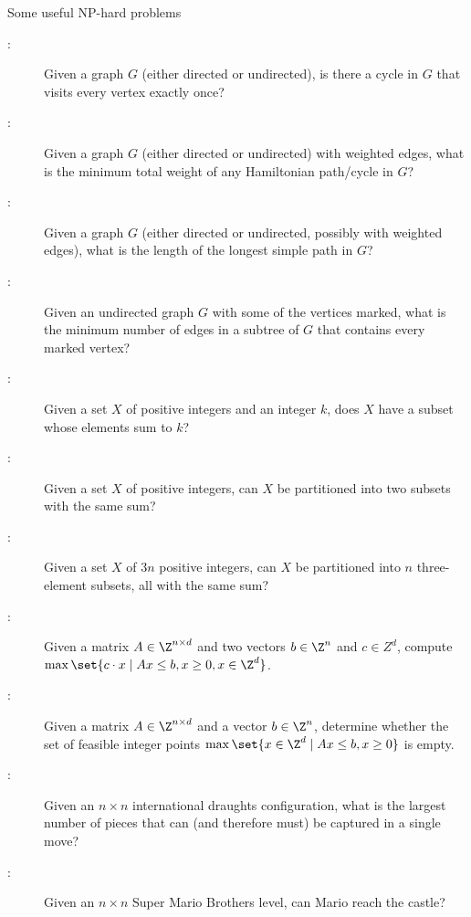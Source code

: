 \documentclass[11pt]{article}
\begin{document}
\begin{Rubric}{Some useful NP-hard problems}
\begin{description}
\item[:]
Given a graph $G$ (either directed or undirected), is there a cycle in $G$ that visits every vertex exactly once?

\item[:]
Given a graph $G$ (either directed or undirected) with weighted edges, what is the minimum total weight of any Hamiltonian path/cycle in $G$?

\item[:]
Given a graph $G$ (either directed or undirected, possibly with weighted edges), what is the length of the longest simple path in $G$?

\item[:]  Given an undirected graph $G$ with some of the vertices marked, what is the minimum number of edges in a subtree of $G$ that contains every marked vertex? 

\item[:]
Given a set $X$ of positive integers and an integer $k$, does $X$ have a subset whose elements sum to $k$?

\item[:]
Given a set $X$ of positive integers, can $X$ be partitioned into two subsets with the same sum?

\item[:]
Given a set $X$ of $3n$ positive integers, can $X$ be partitioned into $n$ three-element subsets, all with the same sum?

\item[:]
Given a matrix $A\in\Z^{n\times d}$ and two vectors $b\in\Z^n$ and $c\in Z^d$, compute  $\max\set{c\cdot x\mid Ax\le b, x\ge 0, x\in\Z^d}$.

\item[:]
Given a matrix $A\in\Z^{n\times d}$ and a vector $b\in\Z^n$, determine whether the set of feasible integer points $\max\set{x\in\Z^d\mid Ax\le b, x\ge 0}$ is empty.

\item[:]
Given an $n\times n$ international draughts configuration, what is the largest number of pieces that can (and therefore must) be captured in a single move?

\item[:]
Given an $n\times n$ Super Mario Brothers level, can Mario reach the castle?

\end{description}
\end{Rubric}

\end{document}
